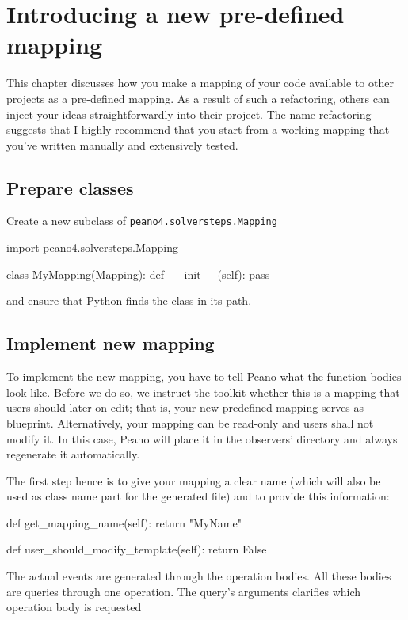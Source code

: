 \chapter{Introducing a new pre-defined mapping}
\label{section:logging}

This chapter discusses how you make a mapping of your code available to other
projects as a pre-defined mapping.
As a result of such a refactoring, others can inject your ideas
straightforwardly into their project.
The name refactoring suggests that I highly recommend that you start from a
working mapping that you've written manually and extensively tested.

\section{Prepare classes}

Create a new subclass of \texttt{peano4.solversteps.Mapping}

\begin{code}
import peano4.solversteps.Mapping

class MyMapping(Mapping):
  def __init__(self):
    pass
\end{code}

\noindent
and ensure that Python finds the class in its path.


\section{Implement new mapping}

To implement the new mapping, you have to tell Peano what the function bodies
look like.
Before we do so, we instruct the toolkit whether this is a mapping that users
should later on edit; 
that is, your new predefined mapping serves as blueprint.
Alternatively, your mapping can be read-only and users shall not modify it.
In this case, Peano will place it in the observers' directory and always
regenerate it automatically.


The first step hence is to give your mapping a clear name (which will also be
used as class name part for the generated file) and to provide this information:


\begin{code}
  def get_mapping_name(self):
    return "MyName"

  def user_should_modify_template(self):
    return False
\end{code}


\noindent
The actual events are generated through the operation bodies.
All these bodies are queries through one operation. 
The query's arguments clarifies which operation body is requested

